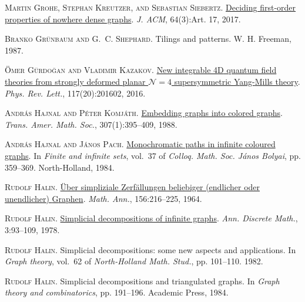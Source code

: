 \documentclass[a4paper,11pt]{article}
\theoremstyle{plain}
\theoremstyle{definition}
\begin{document}
\textsc{Martin Grohe, Stephan Kreutzer, and Sebastian Siebertz}.
\newblock \href{https://doi.org/10.1145/3051095}{Deciding first-order
  properties of nowhere dense graphs}.
\newblock \emph{J. ACM}, 64(3):Art. 17, 2017.

\textsc{Branko Gr\"{u}nbaum and G.~C. Shephard}.
\newblock Tilings and patterns.
\newblock W. H. Freeman, 1987.

\textsc{\"{O}mer G\"{u}rdo\u{g}an and Vladimir Kazakov}.
\newblock \href{https://doi.org/10.1103/PhysRevLett.117.201602}{New integrable
  4{D} quantum field theories from strongly deformed planar {$\mathcal{N} = 4$}
  supersymmetric {Y}ang-{M}ills theory}.
\newblock \emph{Phys. Rev. Lett.}, 117(20):201602, 2016.

\textsc{Andr\'as Hajnal and P\'{e}ter Komj\'{a}th}.
\newblock \href{https://doi.org/10.2307/2000770}{Embedding graphs into colored
  graphs}.
\newblock \emph{Trans. Amer. Math. Soc.}, 307(1):395--409, 1988.

\textsc{Andr\'as Hajnal and J\'anos Pach}.
\newblock
  \href{https://doi.org/10.1016/B978-0-444-86893-0.50028-0}{Monochromatic paths
  in infinite coloured graphs}.
\newblock In \emph{Finite and infinite sets}, vol.~37 of \emph{Colloq. Math.
  Soc. J\'{a}nos Bolyai}, pp. 359--369. North-Holland, 1984.

\textsc{Rudolf Halin}.
\newblock \href{https://doi.org/10.1007/BF01363288}{\"{U}ber simpliziale
  {Z}erf\"{a}llungen beliebiger (endlicher oder unendlicher) {G}raphen}.
\newblock \emph{Math. Ann.}, 156:216--225, 1964.

\textsc{Rudolf Halin}.
\newblock \href{https://doi.org/10.1016/S0167-5060(08)70500-4}{Simplicial
  decompositions of infinite graphs}.
\newblock \emph{Ann. Discrete Math.}, 3:93--109, 1978.

\textsc{Rudolf Halin}.
\newblock Simplicial decompositions: some new aspects and applications.
\newblock In \emph{Graph theory}, vol.~62 of \emph{North-Holland Math. Stud.},
  pp. 101--110. 1982.

\textsc{Rudolf Halin}.
\newblock Simplicial decompositions and triangulated graphs.
\newblock In \emph{Graph theory and combinatorics}, pp. 191--196. Academic
  Press, 1984.
\end{document}

